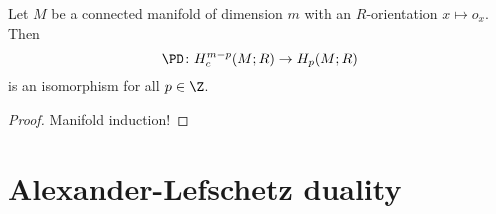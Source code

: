 \documentclass[main.tex]{subfiles}
\begin{document}
\begin{theorem}
  Let \(M\) be a connected manifold of dimension \(m\) with an \(R\)-orientation \(x \mapsto o_{x}\). Then
  \begin{equation*}
    \PD\colon H^{m-p}_{c}(M; R) \to H_{p}(M; R)
  \end{equation*}
  is an isomorphism for all \(p \in \Z\).
\end{theorem}
\begin{proof}
  Manifold induction!
\end{proof}

\section{Alexander-Lefschetz duality}
\label{sec:alexander_lefschetz_duality}
\end{document}
